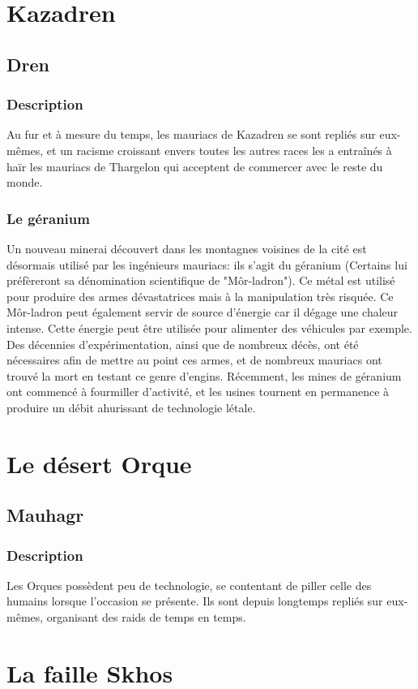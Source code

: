 \section{Kazadren}
\subsection{Dren}
\subsubsection{Description}
Au fur et à mesure du temps, les mauriacs de Kazadren se sont repliés sur eux-mêmes, et un racisme croissant envers toutes les autres races les a entraînés à haïr les mauriacs de Thargelon qui acceptent de commercer avec le reste du monde.
\subsubsection{Le géranium}
Un nouveau minerai découvert dans les montagnes voisines de la cité est désormais utilisé par les ingénieurs mauriacs: ils s'agit du géranium (Certains lui préfèreront sa dénomination scientifique de "Môr-ladron"). Ce métal est utilisé pour produire des armes dévastatrices mais à la manipulation très risquée. Ce Môr-ladron peut également servir de source d'énergie car il dégage une chaleur intense. Cette énergie peut être utilisée pour alimenter des véhicules par exemple. Des décennies d'expérimentation, ainsi que de nombreux décès, ont été nécessaires afin de mettre au point ces armes, et de nombreux mauriacs ont trouvé la mort en testant ce genre d'engins. Récemment, les mines de géranium ont commencé à fourmiller d'activité, et les usines tournent en permanence à produire un débit ahurissant de technologie létale.
\section{Le désert Orque}
\subsection{Mauhagr}
\subsubsection{Description}
Les Orques possèdent peu de technologie, se contentant de piller celle des humains lorsque l'occasion se présente. Ils sont depuis longtemps repliés sur eux-mêmes, organisant des raids de temps en temps.
\section{La faille Skhos}
